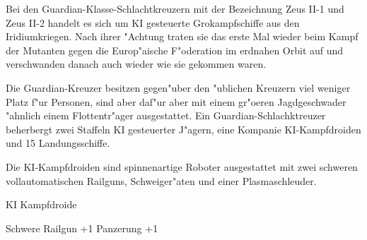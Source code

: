 
Bei den Guardian-Klasse-Schlachtkreuzern mit der Bezeichnung Zeus II-1 und Zeus II-2 handelt es sich um KI gesteuerte Gro\3kampfschiffe aus den Iridiumkriegen. Nach ihrer "Achtung traten sie das erste Mal wieder beim Kampf der Mutanten gegen die Europ"aische F"oderation im erdnahen Orbit auf und verschwanden danach auch wieder wie sie gekommen waren.

Die Guardian-Kreuzer besitzen gegen"uber den "ublichen Kreuzern viel weniger Platz f"ur Personen, sind aber daf"ur aber mit einem gr"o\3eren Jagdgeschwader "ahnlich einem Flottentr"ager ausgestattet. Ein Guardian-Schlachktreuzer beherbergt zwei Staffeln KI gesteuerter J"agern, eine Kompanie KI-Kampfdroiden und 15 Landungsschiffe.

Die KI-Kampfdroiden sind spinnenartige Roboter ausgestattet mit zwei schweren vollautomatischen Railguns, Schwei\3ger"aten und einer Plasmaschleuder.

\begin{nscsheet}[f]{KI Kampfdroide}
    \nscstats[ATT=3,AGG=3,CON=2]
    \nscruler
    \begin{nscinventory}
        \nscitem[Waffen] Schwere Railgun +1
        \nscitem[R"ustung] Panzerung +1
    \end{nscinventory}
\end{nscsheet}
